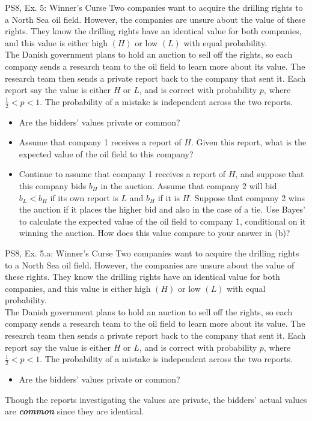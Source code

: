 \begin{frame}{PS8, Ex. 5: Winner's Curse}
      Two companies want to acquire the drilling rights to a North Sea oil field. However, the companies are unsure about the value of these rights. They know the drilling rights have an identical value for both companies, and this value is either high $(H)$ or low $(L)$ with equal probability.\\\medskip
      The Danish government plans to hold an auction to sell off the rights, so each company sends a research team to the oil field to learn more about its value. The research team then sends a private report back to the company that sent it. Each report say the value is either $H$ or $L$, and is correct with probability $p$, where $\frac{1}{2} < p < 1$. The probability of a mistake is independent across the two reports.
      \begin{itemize}
        \item[(a)] Are the bidders’ values private or common?
        \item[(b)] Assume that company 1 receives a report of $H$. Given this report, what is the expected value of the oil field to this company?
        \item[(c)] Continue to assume that company 1 receives a report of $H$, and suppose that this company bids $b_H$ in the auction. Assume that company 2 will bid $b_L < b_H$ if its own report is $L$ and $b_H$ if it is $H$. Suppose that company 2 wins the auction if it places the higher bid and also in the case of a tie. Use Bayes’ to calculate the expected value of the oil field to company 1, conditional on it winning the auction. How does this value compare to your answer in (b)?
      \end{itemize}
      \vfill\null
\end{frame}


\begin{frame}{PS8, Ex. 5.a: Winner's Curse}
    Two companies want to acquire the drilling rights to a North Sea oil field. However, the companies are unsure about the value of these rights. They know the drilling rights have an identical value for both companies, and this value is either high $(H)$ or low $(L)$ with equal probability.\\\medskip
    The Danish government plans to hold an auction to sell off the rights, so each company sends a research team to the oil field to learn more about its value. The research team then sends a private report back to the company that sent it. Each report say the value is either $H$ or $L$, and is correct with probability $p$, where $\frac{1}{2} < p < 1$. The probability of a mistake is independent across the two reports.
    \begin{itemize}
      \item[(a)] Are the bidders’ values private or common?
    \end{itemize}
    Though the reports investigating the values are private, the bidders' actual values are \textit{\textbf{common}} since they are identical.
    \vfill\null
\end{frame}


